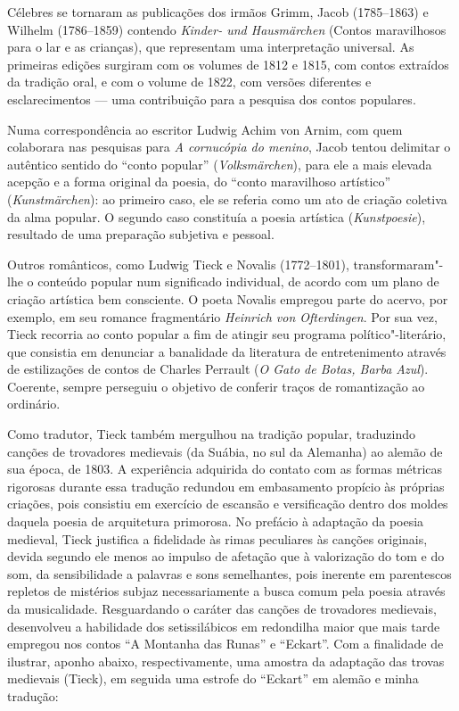 Célebres se tornaram as publicações dos irmãos Grimm, Jacob (1785--1863)
e Wilhelm (1786--1859) contendo \textit{Kinder- und Hausmärchen}
(Contos maravilhosos para o lar e as crianças), que
representam uma interpretação universal. As primeiras edições surgiram
com os volumes de 1812 e 1815, com contos extraídos da tradição oral, e
com o volume de 1822, com versões diferentes e esclarecimentos — uma
contribuição para a pesquisa dos contos populares.

Numa correspondência ao escritor Ludwig Achim von Arnim, com quem
colaborara nas pesquisas para \textit{A cornucópia do menino}, Jacob tentou
delimitar o autêntico sentido do ``conto popular'' (\textit{Volksmärchen}), para
ele a mais elevada acepção e a forma original da poesia, do ``conto maravilhoso
artístico'' (\textit{Kunstmärchen}): ao primeiro caso, ele se referia como um ato
de criação coletiva da alma popular. O segundo caso constituía a poesia
artística (\textit{Kunstpoesie}), resultado de uma preparação subjetiva e pessoal. 

Outros românticos, como Ludwig Tieck e Novalis (1772--1801),
transformaram"-lhe o conteúdo popular num significado individual, de
acordo com um plano de criação artística bem consciente. O poeta
Novalis empregou parte do acervo, por exemplo, em seu romance
fragmentário \textit{Heinrich von Ofterdingen}. Por sua vez, Tieck
recorria ao conto popular a fim de atingir seu programa
político"-literário, que consistia em denunciar a banalidade da
literatura de entretenimento através de estilizações de contos de
Charles Perrault (\textit{O Gato de Botas, Barba Azul}). Coerente, sempre
perseguiu o objetivo de conferir traços de romantização ao \mbox{ordinário}.  

Como tradutor, Tieck também mergulhou na tradição popular, traduzindo
canções de trovadores medievais (da
Suábia, no sul da Alemanha) ao alemão de sua época, de 1803. A experiência
adquirida do contato com as formas métricas rigorosas durante essa
tradução redundou em embasamento propício às próprias criações, pois
consistiu em exercício de escansão e versificação dentro dos moldes
daquela poesia de arquitetura primorosa. No prefácio à adaptação da
poesia medieval, Tieck justifica a fidelidade às rimas peculiares às
canções originais, devida segundo ele menos ao impulso de afetação que
à valorização do tom e do som, da sensibilidade a palavras e sons
semelhantes, pois inerente em parentescos repletos de mistérios subjaz
necessariamente a busca comum pela poesia através da musicalidade.
Resguardando o caráter das canções de trovadores medievais, desenvolveu
a habilidade dos setissilábicos em redondilha maior que mais tarde
empregou nos contos ``A Montanha das Runas'' e ``Eckart''. Com a
finalidade de ilustrar, aponho abaixo, respectivamente, uma amostra da
adaptação das trovas medievais (Tieck), em seguida uma estrofe do
``Eckart'' em alemão e minha tradução:


